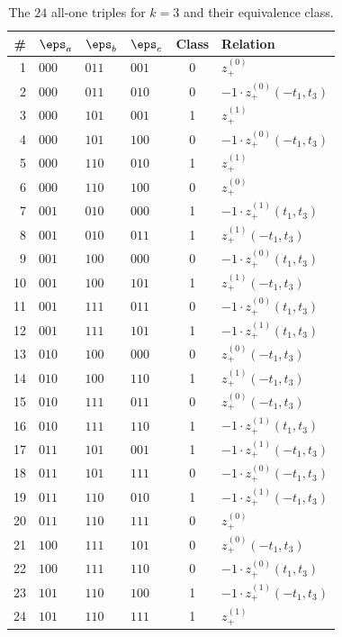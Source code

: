 \begin{table}[ht]
\centering
\footnotesize
\begin{tabular}{r@{\;}l@{\;}l@{\;}l@{\quad}c@{\quad}l}
\hline
\# & $\eps_a$ & $\eps_b$ & $\eps_c$ & Class & Relation \\
\hline
 1 & $000$ & $011$ & $001$ & 0 & $z_+^{(0)}$ \\
 2 & $000$ & $011$ & $010$ & 0 & $-1\cdot z_+^{(0)}(-t_1, t_3)$ \\
 3 & $000$ & $101$ & $001$ & 1 & $z_+^{(1)}$ \\
 4 & $000$ & $101$ & $100$ & 0 & $-1\cdot z_+^{(0)}(-t_1, t_3)$ \\
 5 & $000$ & $110$ & $010$ & 1 & $z_+^{(1)}$ \\
 6 & $000$ & $110$ & $100$ & 0 & $z_+^{(0)}$ \\
 7 & $001$ & $010$ & $000$ & 1 & $-1\cdot z_+^{(1)}(t_1, t_3)$ \\
 8 & $001$ & $010$ & $011$ & 1 & $z_+^{(1)}(-t_1, t_3)$ \\
 9 & $001$ & $100$ & $000$ & 0 & $-1\cdot z_+^{(0)}(t_1, t_3)$ \\
10 & $001$ & $100$ & $101$ & 1 & $z_+^{(1)}(-t_1, t_3)$ \\
11 & $001$ & $111$ & $011$ & 0 & $-1\cdot z_+^{(0)}(t_1, t_3)$ \\
12 & $001$ & $111$ & $101$ & 1 & $-1\cdot z_+^{(1)}(t_1, t_3)$ \\
13 & $010$ & $100$ & $000$ & 0 & $z_+^{(0)}(-t_1, t_3)$ \\
14 & $010$ & $100$ & $110$ & 1 & $z_+^{(1)}(-t_1, t_3)$ \\
15 & $010$ & $111$ & $011$ & 0 & $z_+^{(0)}(-t_1, t_3)$ \\
16 & $010$ & $111$ & $110$ & 1 & $-1\cdot z_+^{(1)}(t_1, t_3)$ \\
17 & $011$ & $101$ & $001$ & 1 & $-1\cdot z_+^{(1)}(-t_1, t_3)$ \\
18 & $011$ & $101$ & $111$ & 0 & $-1\cdot z_+^{(0)}(-t_1, t_3)$ \\
19 & $011$ & $110$ & $010$ & 1 & $-1\cdot z_+^{(1)}(-t_1, t_3)$ \\
20 & $011$ & $110$ & $111$ & 0 & $z_+^{(0)}$ \\
21 & $100$ & $111$ & $101$ & 0 & $z_+^{(0)}(-t_1, t_3)$ \\
22 & $100$ & $111$ & $110$ & 0 & $-1\cdot z_+^{(0)}(t_1, t_3)$ \\
23 & $101$ & $110$ & $100$ & 1 & $-1\cdot z_+^{(1)}(-t_1, t_3)$ \\
24 & $101$ & $110$ & $111$ & 1 & $z_+^{(1)}$ \\
\hline
\end{tabular}
\caption{The $24$ all-one triples for $k=3$ and their equivalence class.}
\label{tab:k3triples}
\end{table}